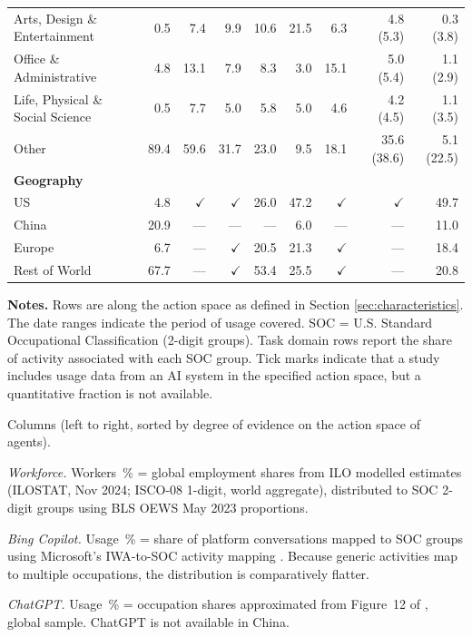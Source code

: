 \documentclass[manuscript,screen,nonacm,oneside]{acmart}
\begin{document}
\begin{table}[htbp]
{\begin{tabular}{lrrrrrrrr}
Arts, Design \& Entertainment & 0.5 & 7.4 & 9.9 & 10.6 & 21.5 & 6.3 & 4.8 (5.3) & 0.3 (3.8) \\
Office \& Administrative & 4.8 & 13.1 & 7.9 & 8.3 & 3.0 & 15.1 & 5.0 (5.4) & 1.1 (2.9) \\
Life, Physical \& Social Science & 0.5 & 7.7 & 5.0 & 5.8 & 5.0 & 4.6 & 4.2 (4.5) & 1.1 (3.5) \\
Other & 89.4 & 59.6 & 31.7 & 23.0 & 9.5 & 18.1 & 35.6 (38.6) & 5.1 (22.5) \\
\midrule
\multicolumn{9}{l}{\textbf{Geography}} \\
US & 4.8 & $\checkmark$ & $\checkmark$ & 26.0 & 47.2 & $\checkmark$ & $\checkmark$ & 49.7 \\
China & 20.9 & --- & --- & --- & 6.0 & --- & --- & 11.0 \\
Europe & 6.7 & --- & $\checkmark$ & 20.5 & 21.3 & $\checkmark$ & --- & 18.4 \\
Rest of World & 67.7 & --- & $\checkmark$ & 53.4 & 25.5 & $\checkmark$ & --- & 20.8 \\
\bottomrule
\end{tabular}
}
\vspace{1mm}
\begin{minipage}{\linewidth}
\scriptsize
\textbf{Notes.} Rows are along the action space as defined in Section \ref{sec:characteristics}. The date ranges indicate the period of usage covered. SOC = U.S. Standard Occupational Classification (2-digit groups). Task domain rows report the share of activity associated with each SOC group. Tick marks indicate that a study  includes usage data from an AI system in the specified action space, but a quantitative fraction is not available.

\medskip
Columns (left to right, sorted by degree of evidence on the action space of agents).

\textit{Workforce.} Workers~\% = global employment shares from ILO modelled estimates (ILOSTAT, Nov 2024; ISCO-08 1-digit, world aggregate), distributed to SOC 2-digit groups using BLS OEWS May 2023 proportions.

\textit{Bing Copilot.} Usage~\% = share of platform conversations mapped to SOC groups using Microsoft’s IWA-to-SOC activity mapping \citep{yang2025adoption}. Because generic activities map to multiple occupations, the distribution is comparatively flatter.

\textit{ChatGPT.} Usage~\% = occupation shares approximated from Figure~12 of \citep{chatterji2025people}, global sample. ChatGPT is not available in China.


\end{minipage}
\end{table}
\end{document}
